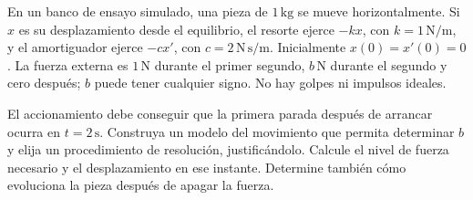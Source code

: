 En un banco de ensayo simulado, una pieza de \(1\,\mathrm{kg}\) se mueve horizontalmente. Si \(x\) es su desplazamiento desde el equilibrio, el resorte ejerce \(-kx\), con \(k=1\,\mathrm{N/m}\), y el amortiguador ejerce \(-cx'\), con \(c=2\,\mathrm{N\,s/m}\). Inicialmente \(x(0)=x'(0)=0\). La fuerza externa es \(1\,\mathrm N\) durante el primer segundo, \(b\,\mathrm N\) durante el segundo y cero después; \(b\) puede tener cualquier signo. No hay golpes ni impulsos ideales.

El accionamiento debe conseguir que la primera parada después de arrancar ocurra en \(t=2\,\mathrm s\). Construya un modelo del movimiento que permita determinar \(b\) y elija un procedimiento de resolución, justificándolo. Calcule el nivel de fuerza necesario y el desplazamiento en ese instante. Determine también cómo evoluciona la pieza después de apagar la fuerza.
